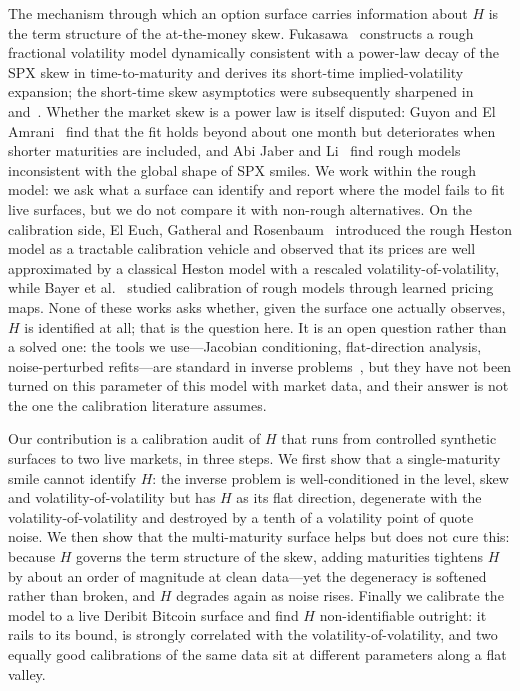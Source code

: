 \documentclass[11pt,a4paper]{article}
\numberwithin{equation}{section}
\begin{document}
The mechanism through which an option surface carries information about $H$ is the term
structure of the at-the-money skew. Fukasawa~\citeyearpar{fukasawa2017} constructs a rough
fractional volatility model dynamically consistent with a power-law decay of the SPX skew
in time-to-maturity and derives its short-time implied-volatility expansion; the
short-time skew asymptotics were subsequently sharpened in~\citet{bfghs2019} and~\citet{efgr2019}.
Whether the market skew is a power law is itself disputed: Guyon and
El Amrani~\citeyearpar{guyonelamrani2023} find that the fit holds beyond about one month but
deteriorates when shorter maturities are included, and Abi Jaber and
Li~\citeyearpar{abijaberli2025} find rough models inconsistent with the global shape of SPX
smiles. We work within the rough model: we ask what a surface can identify and report
where the model fails to fit live surfaces, but we do not compare it with non-rough
alternatives. On
the calibration side, El Euch, Gatheral and Rosenbaum~\citeyearpar{egr2019} introduced the rough
Heston model as a tractable calibration vehicle and observed that its prices are well
approximated by a classical Heston model with a rescaled volatility-of-volatility, while
Bayer et al.~\citeyearpar{bhmst2019} studied calibration of rough models through learned pricing
maps. None of these works asks whether, given the surface one actually observes, $H$ is
identified at all; that is the question here. It is an open question rather than a solved
one: the tools we use---Jacobian conditioning, flat-direction analysis, noise-perturbed
refits---are standard in inverse problems~\citep{tms2010}, but they have not been turned on this parameter
of this model with market data, and their answer is not the one the calibration literature
assumes.

Our contribution is a calibration audit of $H$ that runs from controlled synthetic surfaces to two
live markets, in three steps. We first show that a single-maturity smile cannot identify $H$: the
inverse problem is well-conditioned in the level, skew and volatility-of-volatility but has $H$ as
its flat direction, degenerate with the volatility-of-volatility and destroyed by a tenth of a
volatility point of quote noise. We then show that the multi-maturity surface helps but does not
cure this: because $H$ governs the term structure of the skew, adding maturities tightens $H$ by
about an order of magnitude at clean data---yet the degeneracy is softened rather than broken, and
$H$ degrades again as noise rises. Finally we calibrate the model to a live Deribit Bitcoin surface
and find $H$ non-identifiable outright: it rails to its bound, is strongly correlated
with the volatility-of-volatility, and two equally good calibrations of the same data sit at different parameters along a
flat valley.
\end{document}
